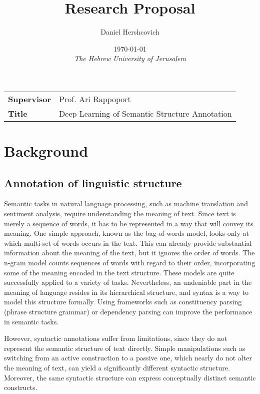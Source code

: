 \documentclass[11pt]{article}
\title{Research Proposal}
\author{Daniel Hershcovich}
\date{\today \\ \textit{The Hebrew University of Jerusalem}}
\begin{document}
\maketitle

\begin{table}[!th]
\begin{tabular}{>{\bfseries}l p{}}
Supervisor & Prof. Ari Rappoport \\
Title & Deep Learning of Semantic Structure Annotation
\end{tabular}
\end{table}



\section{Background}

\subsection{Annotation of linguistic structure}

Semantic tasks in natural language processing, such as machine translation and sentiment analysis, require understanding the meaning of text. Since text is merely a sequence of words, it has to be represented in a way that will convey its meaning. One simple approach, known as the bag-of-words model\cite{harris1954distributional}, looks only at which multi-set of words occurs in the text. This can already provide substantial information about the meaning of the text, but it ignores the order of words. The n-gram model\cite{Brown:1992:CNG:176313.176316} counts sequences of words with regard to their order, incorporating some of the meaning encoded in the text structure. These models are quite successfully applied to a variety of tasks. Nevertheless, an undeniable part in the meaning of language resides in its hierarchical structure, and syntax is a way to model this structure formally. Using frameworks such as constituency parsing (phrase structure grammar)\cite{chomsky1957syntactic} or dependency parsing\cite{tesniere1959elements} can improve the performance in semantic tasks.

However, syntactic annotations suffer from limitations, since they do not represent the semantic structure of text directly. Simple manipulations such as switching from an active construction to a passive one, which nearly do not alter the meaning of text, can yield a significantly different syntactic structure. Moreover, the same syntactic structure can express conceptually distinct semantic constructs\cite{abend2013ucca}.
\end{document}
